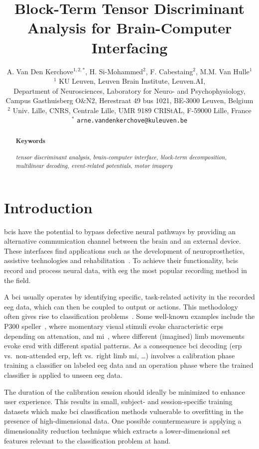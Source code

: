 \documentclass[twocolumn]{article}
\title{Block-Term Tensor Discriminant Analysis for Brain-Computer Interfacing}
\author{%
	A. Van Den Kerchove$^{1,2,*}$,
	H. Si-Mohammed$^{2}$,
	F. Cabestaing$^{2}$,
	M.M. Van Hulle$^{1}$
	\bigskip\\
	$^1$ KU Leuven,
	Leuven Brain Institute,
	Leuven.AI,\\
	Department of Neurosciences,
	Laboratory for Neuro- and Psychophysiology,	\\
	Campus Gasthuisberg O\&N2,
	Herestraat 49 bus 1021,
	BE-3000 Leuven,
	Belgium
	\smallskip\\
	$^2$ Univ. Lille, CNRS, Centrale Lille,
	UMR 9189 CRIStAL,
	F-59000 Lille,
	France
	\smallskip\\
	$^*$ \texttt{arne.vandenkerchove@kuleuven.be}
}
\begin{document}
\maketitle

\begin{abstract}
	

	\paragraph{Keywords}
	\emph{%
		tensor discriminant analysis,
		brain-computer interface,
		block-term decomposition,
		multilinear decoding,
		event-related potentials,
		motor imagery
	}
\end{abstract}


\section{Introduction}

\Acp{bci} have the potential to bypass
defective neural pathways by providing an alternative communication channel
between the brain and an external device.
These interfaces find applications such as the development of
neuroprosthetics, assistive technologies and rehabilitation~\cite{Wolpaw2020}.
To achieve their functionality, \acp{bci} record and process neural data,  with
\ac{eeg} the most popular recording method in the field.

A \ac{bci} usually operates by identifying specific, task-related activity in
the recorded \ac{eeg} data, which can then be coupled to output or actions.
This methodology often gives rise to classification problems~\cite{Lotte2018}.
Some well-known examples include the P300 speller~\cite{Krusienski2006}, where
momentary visual stimuli evoke characteristic \acp{erp} depending on attenation,
and \ac{mi}~\cite{Aggarwal2019}, where different (imagined) limb movements evoke
\ac{ersd} with different spatial patterns.
As a consequence \ac{bci} decoding (\ac{erp} vs.\ non-attended \ac{erp}, left
vs.\ right limb \ac{mi}, \ldots) involves a calibration phase training a classifier
on labeled \ac{eeg} data and an operation phase where the trained classifier is applied
to unseen \ac{eeg} data.

The duration of the calibration session should ideally be minimized to enhance
user experience.
This results in small, subject- and session-specific training datasets
which make \ac{bci} classification methods vulnerable to overfitting in the
presence of high-dimensional data.
One possible countermeasure is applying a dimensionality reduction technique
which extracts a lower-dimensional set features relevant to the classification
problem at hand.
\end{document}
